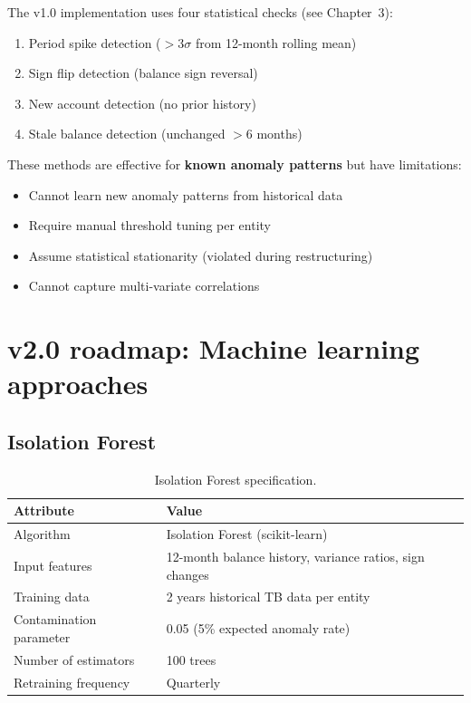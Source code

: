 \documentclass[11pt,a4paper,twoside]{report}
\begin{document}
The v1.0 implementation uses four statistical checks (see Chapter~3):
\begin{enumerate}
\item Period spike detection ($>3\sigma$ from 12-month rolling mean)
\item Sign flip detection (balance sign reversal)
\item New account detection (no prior history)
\item Stale balance detection (unchanged $>$6 months)
\end{enumerate}

These methods are effective for \textbf{known anomaly patterns} but have
limitations:
\begin{itemize}
\item Cannot learn new anomaly patterns from historical data
\item Require manual threshold tuning per entity
\item Assume statistical stationarity (violated during restructuring)
\item Cannot capture multi-variate correlations
\end{itemize}

\section{v2.0 roadmap: Machine learning approaches}

\subsection{Isolation Forest}

\begin{table}[htbp]
\centering
\caption{Isolation Forest specification.}
\footnotesize
\begin{tabularx}{\linewidth}{@{}l X@{}}
\toprule
\textbf{Attribute} & \textbf{Value} \\ \midrule
Algorithm & Isolation Forest (scikit-learn) \\
Input features & 12-month balance history, variance ratios, sign changes \\
Training data & 2 years historical TB data per entity \\
Contamination parameter & 0.05 (5\% expected anomaly rate) \\
Number of estimators & 100 trees \\
Retraining frequency & Quarterly \\
\bottomrule
\end{tabularx}
\end{table}
\end{document}
